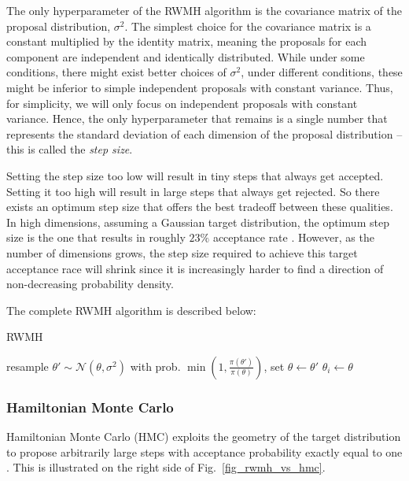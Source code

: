 \documentclass[12pt]{article}
\begin{document}
The only hyperparameter of the RWMH algorithm is the covariance matrix of the proposal distribution, $\sigma^2$. The simplest choice for the covariance matrix is a constant multiplied by the identity matrix, meaning the proposals for each component are independent and identically distributed. While under some conditions, there might exist better choices of $\sigma^2$, under different conditions, these might be inferior to simple independent proposals with constant variance. Thus, for simplicity, we will only focus on independent proposals with constant variance. Hence, the only hyperparameter that remains is a single number that represents the standard deviation of each dimension of the proposal distribution -- this is called the \textit{step size}.

Setting the step size too low will result in tiny steps that always get accepted. Setting it too high will result in large steps that always get rejected. So there exists an optimum step size that offers the best tradeoff between these qualities. In high dimensions, assuming a Gaussian target distribution, the optimum step size is the one that results in roughly $23\%$ acceptance rate \cite{rwmh_accept_rate}. However, as the number of dimensions grows, the step size required to achieve this target acceptance race will shrink since it is increasingly harder to find a direction of non-decreasing probability density.

The complete RWMH algorithm is described below:
\begin{algorithm}
\caption{RWMH}
\label{alg_rwmh}
\begin{algorithmic}
 
	\State resample $\theta' \sim \mathcal{N}(\theta, \sigma^2)$ 
	\State with prob. $\min{(1, \frac{\pi(\theta')}{\pi(\theta)})}$, set $\theta \gets \theta'$ 
	\State $\theta_i \gets \theta$ 
\EndFor
\end{algorithmic}
\end{algorithm}

\subsubsection{Hamiltonian Monte Carlo}

Hamiltonian Monte Carlo (HMC) exploits the geometry of the target distribution to propose arbitrarily large steps with acceptance probability exactly equal to one \cite{hmc}. This is illustrated on the right side of Fig.\ \ref{fig_rwmh_vs_hmc}.
\end{document}
